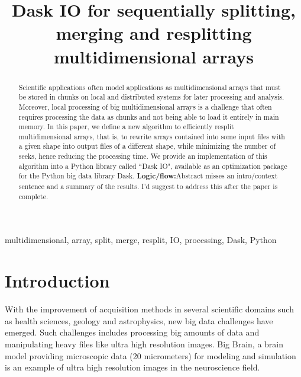 \documentclass[conference]{IEEEtran}
\newcommand{\logic}[1]{\color{red}\textbf{Logic/flow:}#1\color{black}}
\begin{document}
\title{ Dask IO for sequentially splitting, merging and resplitting multidimensional arrays }

\author{
}

\maketitle

\begin{abstract}
Scientific applications often model applications as multidimensional arrays that must be stored in chunks on local and distributed systems for later processing and analysis.
Moreover, local processing of big multidimensional arrays is a challenge that often requires processing the data as chunks and not being able to load it entirely in main memory.
In this paper, we define a new algorithm to efficiently resplit multidimensional arrays, that is, to rewrite arrays contained into some input files with a given shape into output files of a different shape, while minimizing the number of seeks, hence reducing the processing time.
We provide an implementation of this algorithm into a Python library called ``Dask IO", available as an optimization package for the Python big data library Dask.
\logic{Abstract misses an intro/context sentence and a summary of the results.
I'd suggest to address this after the paper is complete.}
\end{abstract}

\begin{IEEEkeywords}
multidimensional, array, split, merge, resplit, IO, processing, Dask, Python
\end{IEEEkeywords}

\section{Introduction}
With the improvement of acquisition methods in several scientific domains such as
health sciences, geology and astrophysics, new big data challenges have emerged.
Such challenges includes processing big amounts of data and manipulating heavy
files like ultra high resolution images. Big Brain, a brain model providing
microscopic data (20 micrometers) for modeling and simulation~\cite{Amunts1472}
is an example of ultra high resolution images in the neuroscience field.
\end{document}
